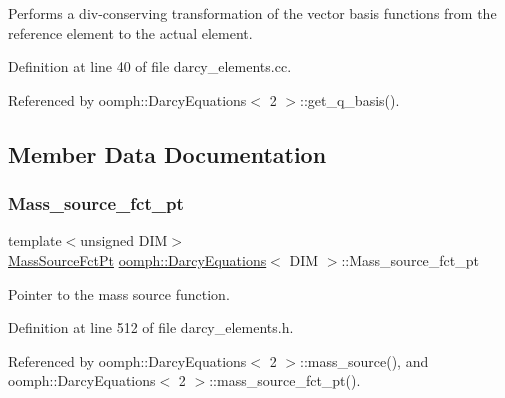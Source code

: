 Performs a div-\/conserving transformation of the vector basis functions from the reference element to the actual element. 



Definition at line 40 of file darcy\+\_\+elements.\+cc.



Referenced by oomph\+::\+Darcy\+Equations$<$ 2 $>$\+::get\+\_\+q\+\_\+basis().



\subsection{Member Data Documentation}
\mbox{\label{classoomph_1_1DarcyEquations_a0e5ac119c2ce542c57852901d0bf227c}} 
\subsubsection{\texorpdfstring{Mass\+\_\+source\+\_\+fct\+\_\+pt}{Mass\_source\_fct\_pt}}
{\footnotesize\ttfamily template$<$unsigned D\+IM$>$ \\
\hyperlink{classoomph_1_1DarcyEquations_abb20685508a2704d195f3b8e124d20b4}{Mass\+Source\+Fct\+Pt} \hyperlink{classoomph_1_1DarcyEquations}{oomph\+::\+Darcy\+Equations}$<$ D\+IM $>$\+::Mass\+\_\+source\+\_\+fct\+\_\+pt\hspace{0.3cm}{\ttfamily [private]}}



Pointer to the mass source function. 



Definition at line 512 of file darcy\+\_\+elements.\+h.



Referenced by oomph\+::\+Darcy\+Equations$<$ 2 $>$\+::mass\+\_\+source(), and oomph\+::\+Darcy\+Equations$<$ 2 $>$\+::mass\+\_\+source\+\_\+fct\+\_\+pt().

\mbox{\label{classoomph_1_1DarcyEquations_a42775534745602bbfb1b926873f3ff94}} 
